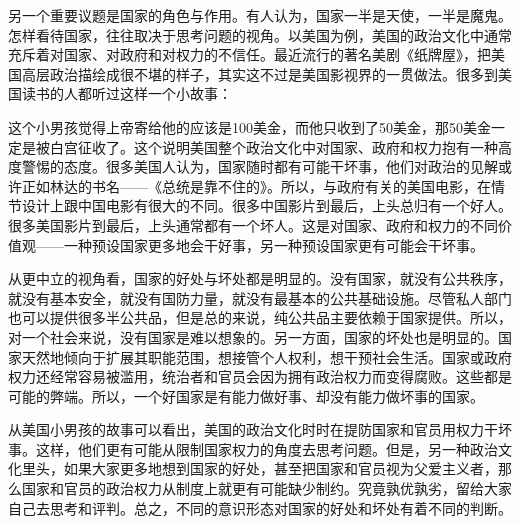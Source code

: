 另一个重要议题是国家的角色与作用。有人认为，国家一半是天使，一半是魔鬼。怎样看待国家，往往取决于思考问题的视角。以美国为例，美国的政治文化中通常充斥着对国家、对政府和对权力的不信任。最近流行的著名美剧《纸牌屋》，把美国高层政治描绘成很不堪的样子，其实这不过是美国影视界的一贯做法。很多到美国读书的人都听过这样一个小故事：


这个小男孩觉得上帝寄给他的应该是100美金，而他只收到了50美金，那50美金一定是被白宫征收了。这个说明美国整个政治文化中对国家、政府和权力抱有一种高度警惕的态度。很多美国人认为，国家随时都有可能干坏事，他们对政治的见解或许正如林达的书名——《总统是靠不住的》。所以，与政府有关的美国电影，在情节设计上跟中国电影有很大的不同。很多中国影片到最后，上头总归有一个好人。很多美国影片到最后，上头通常都有一个坏人。这是对国家、政府和权力的不同价值观——一种预设国家更多地会干好事，另一种预设国家更有可能会干坏事。

从更中立的视角看，国家的好处与坏处都是明显的。没有国家，就没有公共秩序，就没有基本安全，就没有国防力量，就没有最基本的公共基础设施。尽管私人部门也可以提供很多半公共品，但是总的来说，纯公共品主要依赖于国家提供。所以，对一个社会来说，没有国家是难以想象的。另一方面，国家的坏处也是明显的。国家天然地倾向于扩展其职能范围，想接管个人权利，想干预社会生活。国家或政府权力还经常容易被滥用，统治者和官员会因为拥有政治权力而变得腐败。这些都是可能的弊端。所以，一个好国家是有能力做好事、却没有能力做坏事的国家。

从美国小男孩的故事可以看出，美国的政治文化时时在提防国家和官员用权力干坏事。这样，他们更有可能从限制国家权力的角度去思考问题。但是，另一种政治文化里头，如果大家更多地想到国家的好处，甚至把国家和官员视为父爱主义者，那么国家和官员的政治权力从制度上就更有可能缺少制约。究竟孰优孰劣，留给大家自己去思考和评判。总之，不同的意识形态对国家的好处和坏处有着不同的判断。

